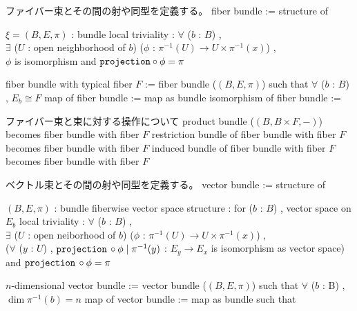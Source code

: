 \begin{Definition}
\itemnote
  ファイバー束とその間の射や同型を定義する。
\itemdefi
  \Define fiber bundle := structure of
  \begin{itemize}
    \itembase \(\xi = (B , E , \pi)\) : bundle
    \itemwith local triviality :
      \(\forall\) (\(b\) : \(B\)) ,\\
      \(\exists\) (\(U\) : open neighborhood of \(b\)) (\(\phi\) : \(\pi^{-1}(U) \to U \times \pi^{-1}(x)\)) , \\
      \(\phi\) is isomorphism and \(\texttt{projection} \circ \phi = \pi\)
  \end{itemize}
\itemdefi
  \Define fiber bundle with typical fiber \(F\) := fiber bundle (\((B , E , \pi)\)) such that \(\forall\) (\(b\) : \(B\)) , \(E_b \cong F\)
\itemdefi
  \Define map of fiber bundle := map as bundle
\itemdefi
  \Define isomorphism of fiber bundle := 
\end{Definition}

\begin{Theorem}
\itemnote
  ファイバー束と束に対する操作について
\itemprop
  product bundle (\((B , B \times F , -)\)) becomes fiber bundle with fiber \(F\)
\itemprop
  restriction bundle of fiber bundle with fiber \(F\) becomes fiber bundle with fiber \(F\)
\itemprop
  induced bundle of fiber bundle with fiber \(F\) becomes fiber bundle with fiber \(F\)
\end{Theorem}

\begin{Definition}
\itemnote
  ベクトル束とその間の射や同型を定義する。
\itemdefi
  \Define vector bundle := structure of
  \begin{itemize}
    \itembase \((B , E , \pi)\) : bundle
    \itemenum fiberwise vector space structure :
      for (\(b\) : \(B\)) , vector space on \(E_b\)
    \itemwith local triviality :
      \(\forall\) (\(b\) : \(B\)) ,\\
      \(\exists\) (\(U\) : open neiborhood of \(b\)) (\(\phi\) : \(\pi^{-1}(U) \to U \times \pi^{-1}(x)\)) , \\
      (\(\forall\) (\(y\) : \(U\)) , \(\texttt{projection} \, \circ \phi \mid \pi^{-1}(y)\) : \(E_y \to E_x\) is isomorphism as vector space) and \(\texttt{projection} \, \circ \phi = \pi\)
  \end{itemize}
\itemdefi
  \Define \(n\)-dimensional vector bundle :=
  vector bundle (\((B , E , \pi)\)) such that \(\forall\) (\(b\) : B) , \(\dim \pi^{-1}(b) = n\)
\itemdefi
  \Define map of vector bundle := map as bundle such that 
\end{Definition}

